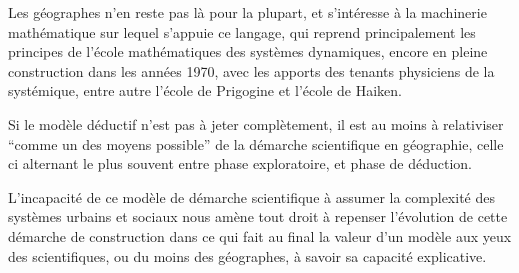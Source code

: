 {Les géographes n'en reste pas là pour la plupart, et s'intéresse à la machinerie mathématique sur lequel s'appuie ce langage, qui reprend principalement les principes de l'école mathématiques des systèmes dynamiques, encore en pleine construction dans les années 1970, avec les apports des tenants physiciens de la systémique, entre autre l'école de Prigogine et l'école de Haiken.


Si le modèle déductif n'est pas à jeter complètement, il est au moins à relativiser \enquote{comme un des moyens possible} de la démarche scientifique en géographie, celle ci alternant le plus souvent entre phase exploratoire, et phase de déduction. \autocite{Sanders2000}

L'incapacité de ce modèle de démarche scientifique à assumer la complexité des systèmes urbains et sociaux nous amène tout droit à repenser l'évolution de cette démarche de construction dans ce qui fait au final la valeur d'un modèle aux yeux des scientifiques, ou du moins des géographes, à savoir sa capacité explicative.

}
